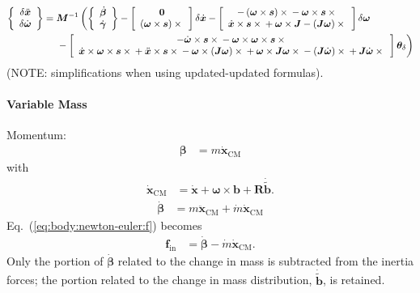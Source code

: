 \documentclass[10pt,fleqn,subeqn]{report}
\newcommand{\T}[1]{\bm{#1}}
\newcommand{\TT}[1]{\bm{#1}}
\begin{document}
\begin{align}
	\cubr{\cvvect{
		\delta\ddot{\T{x}}
		\\
		\delta\dot{\T{\omega}}
	}}
	&=
	\TT{M}^{-1} \lplbr{
		\cubr{\cvvect{
			\dot{\T{\beta}}
			\\
			\dot{\T{\gamma}}
		}}
		-
		\sqbr{\cvvect{
			\T{0}
			\\
			\plbr{\T{\omega} \times \T{s}}\times{}
		}} \delta\dot{\T{x}}
		-
		\sqbr{\cvvect{
			- \plbr{\T{\omega} \times \T{s}} \times{}
			- \T{\omega} \times \T{s} \times{}
			\\
			\dot{\T{x}} \times \T{s} \times{}
			+
			\T{\omega} \times \TT{J}
			-
			\plbr{\TT{J} \T{\omega}} \times {}
		}} \delta\T{\omega}
	}
	\nonumber \\ &\rplbr{\mbox{\hphantom{= }}
		- \sqbr{\cvvect{
			-\dot{\T{\omega}} \times \T{s} \times{}
			- \T{\omega} \times \T{\omega} \times \T{s} \times{}
			\\
			\dot{\T{x}} \times \T{\omega} \times \T{s} \times{}
			+
			\ddot{\T{x}} \times \T{s} \times{}
			-
			\T{\omega} \times \plbr{\TT{J} \T{\omega}} \times{}
			+
			\T{\omega} \times \T{J} \T{\omega} \times{}
			-
			\plbr{\TT{J} \dot{\T{\omega}}} \times{}
			+
			\TT{J} \dot{\T{\omega}} \times{}
		}}\T{\theta}_{\delta}
	}
\end{align}
(NOTE: simplifications when using updated-updated formulas).



\paragraph{Variable Mass}
Momentum:
\begin{align}
	\T{\beta}
	&=
	m \dot{\T{x}}_\text{CM}
\end{align}
with
\begin{align}
	\dot{\T{x}}_\text{CM}
	&=
	\dot{\T{x}}
	+
	\T{\omega} \times \T{b}
	+
	\TT{R} \dot{\tilde{\T{b}}}
	.
\end{align}
\begin{align}
	\dot{\T{\beta}}
	&=
	m \ddot{\T{x}}_\text{CM}
	+
	\dot{m} \dot{\T{x}}_\text{CM}
\end{align}
Eq.~(\ref{eq:body:newton-euler:f}) becomes
\begin{align}
	\T{f}_\text{in}
	&=
	\dot{\T{\beta}}
	-
	\dot{m} \dot{\T{x}}_\text{CM}
	.
\end{align}
Only the portion of $\dot{\T{\beta}}$ related to the change in mass
is subtracted from the inertia forces; the portion related
to the change in mass distribution, $\dot{\tilde{\T{b}}}$, is retained.
\end{document}
